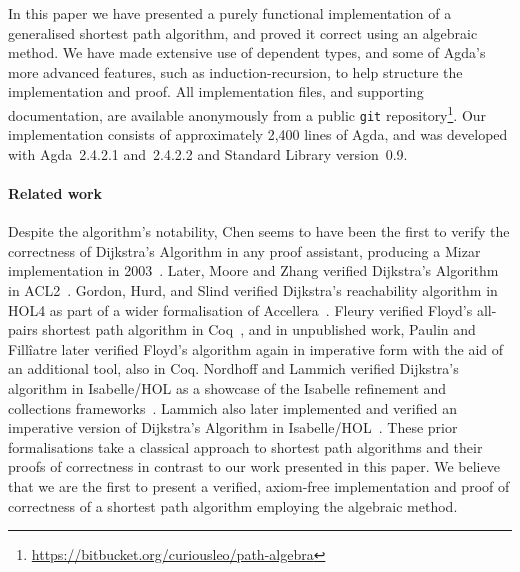In this paper we have presented a purely functional implementation of a generalised shortest path algorithm, and proved it correct using an algebraic method.
We have made extensive use of dependent types, and some of Agda's more advanced features, such as induction-recursion, to help structure the implementation and proof.
All implementation files, and supporting documentation, are available anonymously from a public \texttt{git} repository\footnote{\url{https://bitbucket.org/curiousleo/path-algebra}}.
Our implementation consists of approximately 2,400 lines of Agda, and was developed with Agda~2.4.2.1 and~2.4.2.2 and Standard Library version~0.9.

\paragraph{Related work} Despite the algorithm's notability, Chen seems to have been the first to verify the correctness of Dijkstra's Algorithm in any proof assistant, producing a Mizar implementation in 2003~\cite{chen:dijkstra:2003}.
Later, Moore and Zhang verified Dijkstra's Algorithm in ACL2~\cite{moore:proof-pearl:2005}.
Gordon, Hurd, and Slind verified Dijkstra's reachability algorithm in HOL4 as part of a wider formalisation of Accellera~\cite{gordon:executing:2003}.
Fleury verified Floyd's all-pairs shortest path algorithm in Coq~\cite{fleury:implantation:1990}, and in unpublished work, Paulin and Fill\^iatre later verified Floyd's algorithm again in imperative form with the aid of an additional tool, also in Coq.
Nordhoff and Lammich verified Dijkstra's algorithm in Isabelle/HOL as a showcase of the Isabelle refinement and collections frameworks~\cite{nordhoff-dijkstra-2012}.
Lammich also later implemented and verified an imperative version of Dijkstra's Algorithm in Isabelle/HOL~\cite{lammich:refinement:2015}.
These prior formalisations take a classical approach to shortest path algorithms and their proofs of correctness in contrast to our work presented in this paper.
We believe that we are the first to present a verified, axiom-free implementation and proof of correctness of a shortest path algorithm employing the algebraic method.

